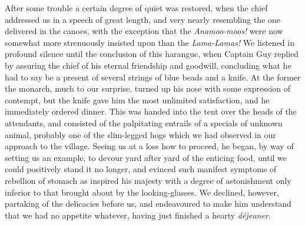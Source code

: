 After some trouble a certain degree of quiet was restored, when the chief
addressed us in a speech of great length, and very nearly resembling the one
delivered in the canoes, with the exception that the \emph{Anamoo-moos!} were
now somewhat more strenuously insisted upon than the \emph{Lama-Lamas!} We
listened in profound silence until the conclusion of this harangue, when Captain
Guy replied by assuring the chief of his eternal friendship and goodwill,
concluding what he had to say be a present of several strings of blue beads and
a knife. At the former the monarch, much to our surprise, turned up his nose
with some expression of contempt, but the knife gave him the most unlimited
satisfaction, and he immediately ordered dinner. This was handed into the tent
over the heads of the attendants, and consisted of the palpitating entrails of a
specials of unknown animal, probably one of the slim-legged hogs which we had
observed in our approach to the village. Seeing us at a loss how to proceed, he
began, by way of setting us an example, to devour yard after yard of the
enticing food, until we could positively stand it no longer, and evinced such
manifest symptoms of rebellion of stomach as inspired his majesty with a degree
of astonishment only inferior to that brought about by the looking-glasses. We
declined, however, partaking of the delicacies before us, and endeavoured to
make him understand that we had no appetite whatever, having just finished a
hearty \emph{déjeuner}. 

